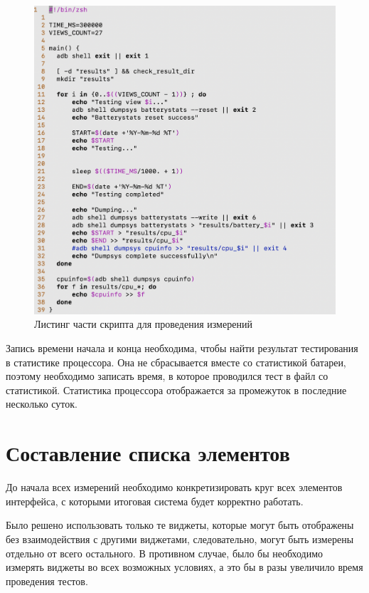 \documentclass[a4paper,14pt]{extarticle} %
\begin{document}
	\begin{figure}[htb]
		\includegraphics[width=\textwidth]{estimation}
		\caption{Листинг части скрипта для проведения измерений}
		\label{fig:estimation}
	\end{figure}
	
	Запись времени начала и конца необходима, чтобы найти результат тестирования в статистике процессора. Она не сбрасывается вместе со статистикой батареи, поэтому необходимо записать время, в которое проводился тест в файл со статистикой. Статистика процессора отображается за промежуток в последние несколько суток.
	
	\clearpage
	\section{Составление списка элементов}
	
	До начала всех измерений необходимо конкретизировать круг всех элементов интерфейса, с которыми итоговая система будет корректно работать.
	
	Было решено использовать только те виджеты, которые могут быть отображены без взаимодействия с другими виджетами, следовательно, могут быть измерены отдельно от всего остального. В противном случае, было бы необходимо измерять виджеты во всех возможных условиях, а это бы в разы увеличило время проведения тестов.
	
\end{document}
